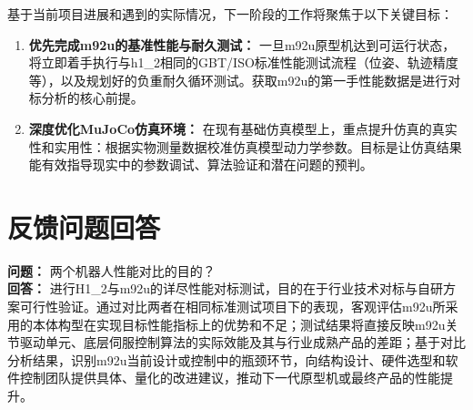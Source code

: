 \documentclass{ctexart}
\begin{document}
基于当前项目进展和遇到的实际情况，下一阶段的工作将聚焦于以下关键目标：

\begin{enumerate}
    \item \textbf{优先完成m92u的基准性能与耐久测试：} 一旦m92u原型机达到可运行状态，将立即着手执行与h1\_2相同的GBT/ISO标准性能测试流程（位姿、轨迹精度等），以及规划好的负重耐久循环测试。获取m92u的第一手性能数据是进行对标分析的核心前提。
    \item \textbf{深度优化MuJoCo仿真环境：} 在现有基础仿真模型上，重点提升仿真的真实性和实用性：根据实物测量数据校准仿真模型动力学参数。目标是让仿真结果能有效指导现实中的参数调试、算法验证和潜在问题的预判。
\end{enumerate}

\section{反馈问题回答}
\noindent
\textbf{问题：} 两个机器人性能对比的目的？\\
\textbf{回答：} 进行H1\_2与m92u的详尽性能对标测试，目的在于行业技术对标与自研方案可行性验证。通过对比两者在相同标准测试项目下的表现，客观评估m92u所采用的本体构型在实现目标性能指标上的优势和不足；测试结果将直接反映m92u关节驱动单元、底层伺服控制算法的实际效能及其与行业成熟产品的差距；基于对比分析结果，识别m92u当前设计或控制中的瓶颈环节，向结构设计、硬件选型和软件控制团队提供具体、量化的改进建议，推动下一代原型机或最终产品的性能提升。
\end{document}
